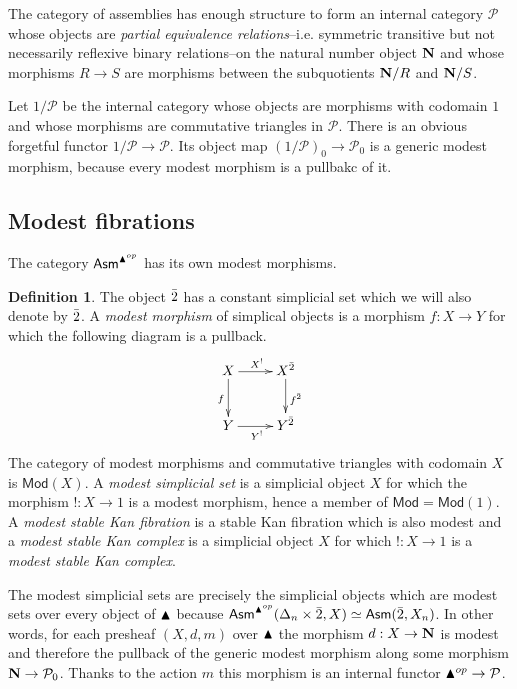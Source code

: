 \documentclass{amsart}
\theoremstyle{plain}
\theoremstyle{definition}
\newtheorem{defin}[theorem]{Definition}
\newcommand\cat\mathcal
\begin{document}
\newcommand\pers{\cat P}
The category of assemblies has enough structure to form an internal category $\pers$ whose objects are \emph{partial equivalence relations}--i.e. symmetric transitive but not necessarily reflexive binary relations--on the natural number object $\mathbf{N}$ and whose morphisms $R\to S$ are morphisms between the subquotients $\mathbf{N}/R$ and $\mathbf{N}/S$. 

Let $1/\pers$ be the internal category whose objects are morphisms with codomain $1$ and whose morphisms are commutative triangles in $\pers$. There is an obvious forgetful functor $1/\pers \to \pers$. Its object map $(1/\pers)_0 \to \pers_0$ is a generic modest morphism, because every modest morphism is a pullbakc of it. %

\newcommand\modkanfib{\mathsf{MSKF}}
\subsection{Modest fibrations}
The category $\mathsf{Asm}^{\blacktriangle^{op}}$ has its own modest morphisms.

\newcommand\modfib{\mathsf{Mod}}
\begin{defin} The object ${\bar{2}}$ has a constant simplicial set which we will also denote by ${\bar{2}}$. A \emph{modest morphism} of simplical objects is a morphism $f:X\to Y$ for which the following diagram is a pullback.
\[\xymatrix{
X \ar[r]^{X^\bang} \ar[d]_{f} & X^{\boldy} \ar[d]^{f^{\boldy}}\\
Y \ar[r]_{Y^\bang} & Y^{\boldy}
}\]
The category of modest morphisms and commutative triangles with codomain $X$ is $\modfib(X)$. A \emph{modest simplicial set} is a simplicial object $X$ for which the morphism $!:X\to 1$ is a modest morphism, hence a member of $\modfib = \modfib(1)$. A \emph{modest stable Kan fibration} is a stable Kan fibration which is also modest and a \emph{modest stable Kan complex} is a simplicial object $X$ for which $!:X\to 1$ is a \emph{modest stable Kan complex}.
\end{defin}%

The modest simplicial sets are precisely the simplicial objects which are modest sets over every object of $\blacktriangle$ because $\mathsf{Asm}^{\blacktriangle^{op}}(\Delta_n\times {\bar{2}}, X)\simeq \mathsf{Asm}({\bar{2}}, X_n)$. In other words, for each presheaf $(X,d,m)$ over $\blacktriangle$ the morphism $d:X\to \mathbf{N}$ is modest and therefore the pullback of the generic modest morphism along some morphism $\nno \to \pers_0$. Thanks to the action $m$ this morphism is an internal functor $\simpcat\dual\to\pers$. %
\end{document}
